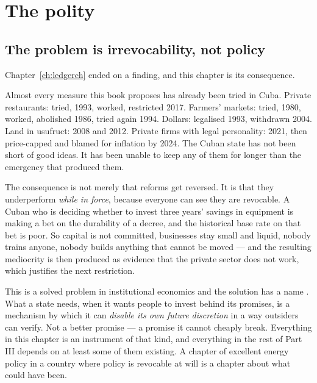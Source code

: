 \chapter{The polity}
\label{ch:polity}

\section{The problem is irrevocability, not policy}

Chapter~\ref{ch:ledgerch} ended on a finding, and this chapter is its
consequence.

Almost every measure this book proposes has already been tried in Cuba. Private
restaurants: tried, 1993, worked, restricted 2017. Farmers' markets: tried,
1980, worked, abolished 1986, tried again 1994. Dollars: legalised 1993,
withdrawn 2004. Land in usufruct: 2008 and 2012. Private firms with legal
personality: 2021, then price-capped and blamed for inflation by 2024. The
Cuban state has not been short of good ideas. It has been unable to keep any of
them for longer than the emergency that produced them.

The consequence is not merely that reforms get reversed. It is that they
underperform \emph{while in force}, because everyone can see they are
revocable. A Cuban who is deciding whether to invest three years' savings in
equipment is making a bet on the durability of a decree, and the historical
base rate on that bet is poor. So capital is not committed, businesses stay
small and liquid, nobody trains anyone, nobody builds anything that cannot be
moved --- and the resulting mediocrity is then produced as evidence that the
private sector does not work, which justifies the next restriction.

This is a solved problem in institutional economics and the solution has a
name \citep{northweingast1989}. What a state needs, when it wants people to invest behind its promises, is
a mechanism by which it can \emph{disable its own future discretion} in a way
outsiders can verify. Not a better promise --- a promise it cannot cheaply
break. Everything in this chapter is an instrument of that kind, and everything
in the rest of Part III depends on at least some of them existing. A chapter of
excellent energy policy in a country where policy is revocable at will is a
chapter about what could have been.

